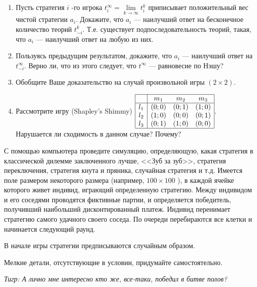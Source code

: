 \begin{problem}
\begin{enumerate}
\item Пусть стратегия  $i$ -го игрока  $t_{i}^{\infty } =\mathop{\lim }\limits_{k\to \infty } t_{i}^{k} $  приписывает положительный вес чистой стратегии  $a_{i} $. Докажите, что  $a_{i} $  --- наилучший ответ на бесконечное количество теорий  $t_{-i}^{k} $. Т.е. существует подпоследовательность теорий, такая, что  $a_{i} $  --- наилучший ответ на любую из них.\par
\item Пользуясь предыдущим результатом, докажите, что  $a_{i} $  --- наилучший ответ на  $t_{-i}^{\infty } $. Верно ли, что из этого следует, что  $t^{\infty } $  --- равновесие по Нэшу?\par
\item Обобщите Ваше доказательство на случай произвольной игры  $\left(2\times 2\right)$.\par
\item Рассмотрите игру (Shapley's Shimmy)  $\begin{array}{|c|ccc|}  \hline {} & {m_{1} } & {m_{2} } & {m_{3} } \\  \hline {l_{1} } & {\left(0;0\right)} & {\left(0;1\right)} & {\left(1;0\right)} \\ {l_{2} } & {\left(1;0\right)} & {\left(0;0\right)} & {\left(0;1\right)} \\ {l_{3} } & {\left(0;1\right)} & {\left(1;0\right)} & {\left(0;0\right)} \\  \hline  \end{array}$. Нарушается ли сходимость в данном случае? Почему?
\end{enumerate}


\begin{sol} \end{sol}
\end{problem}



\begin{problem}
С помощью компьютера проведите симуляцию, определяющую, какая стратегия в классической дилемме заключенного лучше, <<Зуб за зуб>>, стратегия переключения, стратегия кнута и пряника, случайная стратегия и т.д.
Имеется поле размером некоторого размера (например,  $100\times 100$ ), в каждой ячейке которого живет индивид, играющий определенную стратегию.
Между индивидом и его соседями проводятся фиктивные партии, и определяется победитель, получивший наибольший дисконтированный платеж. Индивид перенимает стратегию самого удачного своего соседа. По очереди перебираются все клетки и начинается следующий раунд.\par
В начале игры стратегии предписываются случайным образом.\par
Мелкие детали, отсутствующие в условии, придумайте самостоятельно.\par
{\it Тигр: А лично мне интересно кто же, все-таки, победил в битве полов?}
\begin{sol} \end{sol}
\end{problem}



